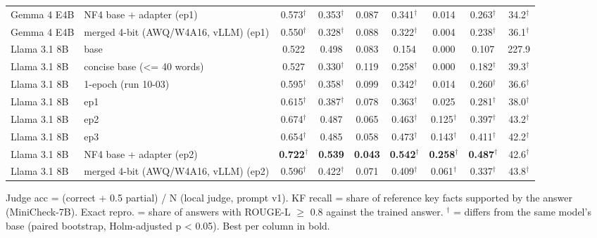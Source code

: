 \begin{table}[t]
{\begin{tabular}{llccccccc}
Gemma 4 E4B & NF4 base + adapter (ep1) & 0.573$^\dagger$ & 0.353$^\dagger$ & 0.087 & 0.341$^\dagger$ & 0.014 & 0.263$^\dagger$ & 34.2$^\dagger$ \\
Gemma 4 E4B & merged 4-bit (AWQ/W4A16, vLLM) (ep1) & 0.550$^\dagger$ & 0.328$^\dagger$ & 0.088 & 0.322$^\dagger$ & 0.004 & 0.238$^\dagger$ & 36.1$^\dagger$ \\
Llama 3.1 8B & base & 0.522 & 0.498 & 0.083 & 0.154 & 0.000 & 0.107 & 227.9 \\
Llama 3.1 8B & concise base (<= 40 words) & 0.527 & 0.330$^\dagger$ & 0.119 & 0.258$^\dagger$ & 0.000 & 0.182$^\dagger$ & 39.3$^\dagger$ \\
Llama 3.1 8B & 1-epoch (run 10-03) & 0.595$^\dagger$ & 0.358$^\dagger$ & 0.099 & 0.342$^\dagger$ & 0.014 & 0.260$^\dagger$ & 36.6$^\dagger$ \\
Llama 3.1 8B & ep1 & 0.615$^\dagger$ & 0.387$^\dagger$ & 0.078 & 0.363$^\dagger$ & 0.025 & 0.281$^\dagger$ & 38.0$^\dagger$ \\
Llama 3.1 8B & ep2 & 0.674$^\dagger$ & 0.487 & 0.065 & 0.463$^\dagger$ & 0.125$^\dagger$ & 0.397$^\dagger$ & 43.2$^\dagger$ \\
Llama 3.1 8B & ep3 & 0.654$^\dagger$ & 0.485 & 0.058 & 0.473$^\dagger$ & 0.143$^\dagger$ & 0.411$^\dagger$ & 42.2$^\dagger$ \\
Llama 3.1 8B & NF4 base + adapter (ep2) & \textbf{0.722$^\dagger$} & \textbf{0.539} & \textbf{0.043} & \textbf{0.542$^\dagger$} & \textbf{0.258$^\dagger$} & \textbf{0.487$^\dagger$} & 42.6$^\dagger$ \\
Llama 3.1 8B & merged 4-bit (AWQ/W4A16, vLLM) (ep2) & 0.596$^\dagger$ & 0.422$^\dagger$ & 0.071 & 0.409$^\dagger$ & 0.061$^\dagger$ & 0.337$^\dagger$ & 43.8$^\dagger$ \\
\bottomrule
\end{tabular}}
\par\smallskip\footnotesize Judge acc = (correct + 0.5 partial) / N (local judge, prompt v1). KF recall = share of reference key facts supported by the answer (MiniCheck-7B). Exact repro. = share of answers with ROUGE-L $\geq$ 0.8 against the trained answer. $^\dagger$ = differs from the same model's base (paired bootstrap, Holm-adjusted p < 0.05). Best per column in bold.
\end{table}
